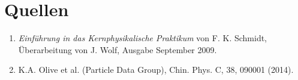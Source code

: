 \documentclass[a4paper,ngerman]{scrartcl}
\begin{document}
\clearpage
\section{Quellen}
\begin{enumerate}
\item \emph{Einführung in das Kernphysikalische Praktikum} von F. K. Schmidt, 
  Überarbeitung von J. Wolf, Ausgabe September 2009. \label{ref:bb}
\item K.A. Olive et al. (Particle Data Group), Chin. Phys. C, 38, 090001 (2014). \label{ref:pdg14}
\end{enumerate}
\end{document}
